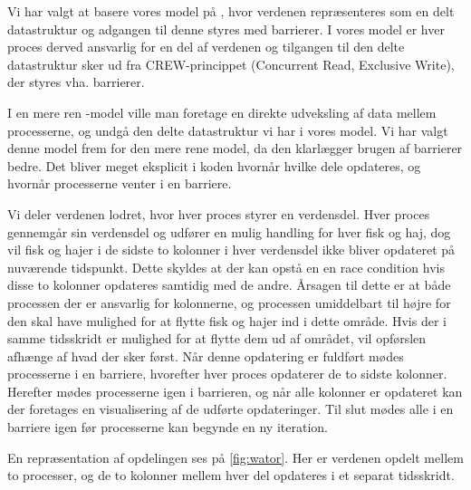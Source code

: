 Vi har valgt at basere vores model på \cite{crew}, hvor verdenen repræsenteres 
som en delt datastruktur og adgangen til denne styres med barrierer. I vores 
model er hver proces derved ansvarlig for en del af verdenen og tilgangen til 
den delte datastruktur sker ud fra CREW-princippet (Concurrent Read, Exclusive 
Write)\cite[5]{crew}, der styres vha. barrierer.  

I en mere ren \csp-model ville man foretage en direkte udveksling af data mellem 
processerne, og undgå den delte datastruktur vi har i vores model.  Vi har 
valgt denne model frem for den mere rene \csp model, da den klarlægger brugen af 
barrierer bedre.  Det bliver meget eksplicit i koden hvornår hvilke dele 
opdateres, og hvornår processerne venter i en barriere.

Vi deler verdenen lodret, hvor hver proces styrer en verdensdel. Hver proces 
gennemgår sin verdensdel og udfører en mulig handling for hver fisk og haj, dog 
vil fisk og hajer i de sidste to kolonner i hver verdensdel ikke bliver 
opdateret på nuværende tidspunkt. Dette skyldes at der kan opstå en en race 
condition hvis disse to kolonner opdateres samtidig med de andre. Årsagen til 
dette er at både processen der er ansvarlig for kolonnerne, og processen 
umiddelbart til højre for den skal have mulighed for at flytte fisk og hajer 
ind i dette område. Hvis der i samme tidsskridt er mulighed for at flytte dem 
ud af området, vil opførslen afhænge af hvad der sker først.  Når denne 
opdatering er fuldført mødes processerne i en barriere, hvorefter hver proces 
opdaterer de to sidste kolonner. Herefter mødes processerne igen i barrieren, 
og når alle kolonner er opdateret kan der foretages en visualisering af de 
udførte opdateringer. Til slut mødes alle i en barriere igen før processerne 
kan begynde en ny iteration.

En repræsentation af opdelingen ses på \cref{fig:wator}. Her er verdenen 
opdelt mellem to processer, og de to kolonner mellem hver del opdateres i et 
separat tidsskridt.  

